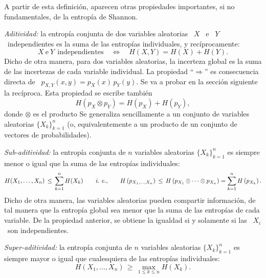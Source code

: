 A partir  de esta  definici\'on, aparecen otras  propiedades importantes,  si no
fundamentales, de la entrop\'ia de Shannon.
%
\begin{propiedades}
\item\label{Prop:SZ:aditividad} {\it Aditividad:}  la entrop\'ia conjunta de dos
  variables  aleatorias \  $X$ \  e \  $Y$ \  independientes es  la suma  de las
  entrop\'ias individuales, y rec\'iprocamente:
  \[
  X \: \mbox{e} \: Y \:\ \mbox{independientes} \quad \Leftrightarrow \quad H(X,Y)
  =  H(X) +  H(Y).
  \]
  Dicho de otra  manera, para dos variables aleatorias, la  incerteza global es
  la  suma  de  las  incertezas  de cada  variable  individual.   La  propiedad
  ``$\Rightarrow$''  es consecuencia  directa  de \  $p_{X,Y}(x,y)  = p_X(x)  \,
  p_Y(y)$.   Se va  a  probar en  la secci\'on  siguiente  la rec\'iproca.  Esta
  propiedad se escribe tambi\'en
  \[
  H\left( p_X \otimes p_Y \right) = H\left( p_X \right) + H\left( p_Y \right),
  \]
  donde  $\otimes$ es el  producto 
  Se  generaliza sencillamente  a un  conjunto de  variables aleatorias  $\{ X_k
  \}_{k=1}^n$ (o, equivalentemente a  un producto  de un conjunto
  de vectores de probabilidades).
%
\item\label{Prop:SZ:subaditividad} {\it  Sub-aditividad:} la entrop\'ia conjunta
  de $n$ variables  aleatorias $\{ X_k \}_{k=1}^n$ es siempre  menor o igual que la suma
  de las entrop\'ias individuales:
  \[
  H(X_1,\ldots,X_n)  \,  \le \,  \sum_{k=1}^n  H(X_k)  \qquad \mbox{{\it i.~e.,}}  \qquad
  H\left(  p_{X_1 , \ldots  , X_n}  \right) \,  \le \,  H\left(  p_{X_1} \otimes
    \cdots \otimes p_{X_n} \right) = \sum_{k=1}^n H\left( p_{X_k} \right).
  \]
  Dicho de otra manera, las variables aleatorias pueden compartir informaci\'on,
  de  tal  manera  que la  entrop\'ia  global  sea  menor  que la  suma  de  las
  entrop\'ias  de  cada variable.   De  la  propiedad  anterior, se  obtiene  la
  igualdad si y solamente si las \ $X_i$ \ son independientes.
%
\item\label{Prop:SZ:superaditividad}   {\it  Super-aditividad:}   la  entrop\'ia
  conjunta de  $n$ variables aleatorias $\{  X_k \}_{k=1}^n$ es siempre  mayor o
  igual que cualesquiera de las entrop\'ias individuales:
  \[
  H(X_1,\ldots,X_n) \, \ge \, \max_{1 \le k \le n} H(X_k).
  \]
\end{propiedades}

